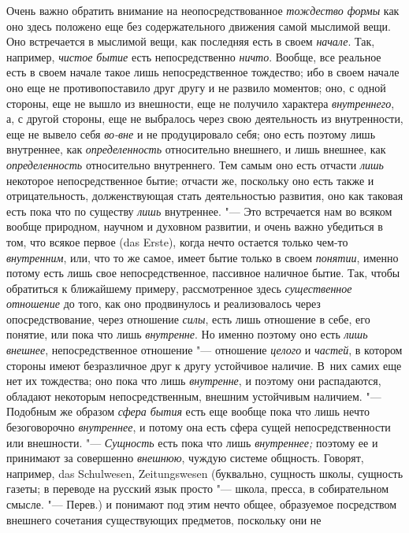 Очень важно обратить внимание на неопосредствованное
{\em тождество формы} как оно здесь положено еще без
содержательного движения самой мыслимой вещи. Оно встречается в мыслимой
вещи, как последняя есть в своем {\em начале}. Так,
например, {\em чистое бытие} есть непосредственно
{\em ничто}. Вообще, все реальное есть в своем начале
такое лишь непосредственное тождество; ибо в своем начале оно еще не
противопоставило друг другу и не развило моментов; оно, с одной стороны,
еще не вышло из внешности, еще не получило характера
{\em внутреннего}, а, с другой стороны, еще не
выбралось через свою деятельность из внутренности, еще не вывело себя
{\em во-вне} и не продуцировало себя; оно есть поэтому
лишь внутреннее, как {\em определенность} относительно
внешнего, и лишь внешнее, как {\em определенность}
относительно внутреннего. Тем самым оно есть отчасти
{\em лишь} некоторое непосредственное бытие; отчасти
же, поскольку оно есть также и отрицательность, долженствующая стать
деятельностью развития, оно как таковая есть пока что по существу
{\em лишь} внутреннее. "--- Это встречается нам во всяком
вообще природном, научном и духовном развитии, и очень важно убедиться в
том, что всякое первое (das Erste), когда нечто остается только чем-то
{\em внутренним}, или, что то же самое, имеет бытие
только в своем {\em понятии}, именно потому есть лишь
свое непосредственное, пассивное наличное бытие. Так, чтобы обратиться к
ближайшему примеру, рассмотренное здесь
{\em существенное отношение} до того, как оно
продвинулось и реализовалось через опосредствование, через отношение
{\em силы}, есть лишь отношение в себе, его понятие,
или пока что лишь {\em внутренне}. Но именно поэтому
оно есть {\em лишь внешнее}, непосредственное отношение
"--- отношение {\em целого} и
{\em частей}, в котором стороны имеют безразличное друг
к другу устойчивое наличие. В~них самих еще нет их тождества; оно пока что
лишь {\em внутренне}, и поэтому они распадаются,
обладают некоторым непосредственным, внешним устойчивым наличием. "---
Подобным же образом {\em сфера бытия} есть еще вообще
пока что лишь нечто безоговорочно {\em внутреннее}, и
потому она есть сфера сущей непосредственности или внешности. "---
{\em Сущность} есть пока что лишь
{\em внутреннее;} поэтому ее и принимают за совершенно
{\em внешнюю}, чуждую системе общность. Говорят,
например, das Schulwesen, Zeitungswesen (буквально, сущность школы,
сущность газеты; в переводе на русский язык просто "--- школа, пресса, в
собирательном смысле. "--- Перев.) и понимают под этим нечто общее, образуемое
посредством внешнего сочетания существующих предметов, поскольку они не

